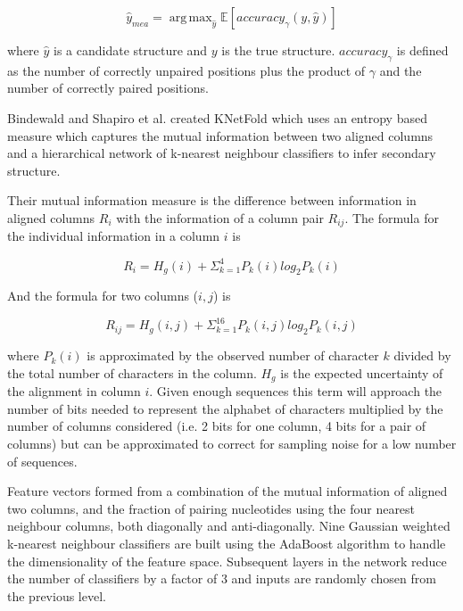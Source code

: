 \documentclass[journal]{IEEEtran}
\DeclareMathOperator*{\argmax}{arg\,max}
\begin{document}
\begin{equation}
	\hat{y}_{mea} = \argmax_{\hat{y}} \mathbb{E}[accuracy_{\gamma}(y, \hat{y})]
\end{equation}

where $\hat{y}$ is a candidate structure and $y$ is the true structure. $accuracy_{\gamma}$ is defined as the number of correctly unpaired positions plus the product of $\gamma$ and the number of correctly paired positions. 

Bindewald and Shapiro et al. \cite{bindewald2006rna} created KNetFold which uses an entropy based measure which captures the mutual information between two aligned columns and a hierarchical network of k-nearest neighbour classifiers to infer secondary structure. 

Their mutual information measure is the difference between information in aligned columns $R_i$ with the information of a column pair $R_{ij}$. The formula for the individual information in a column $i$ is 
	
\begin{equation}
	R_i = H_g(i) + \Sigma_{k=1}^4 P_k(i) log_2 P_k(i)
\end{equation}

And the formula for two columns ($i, j$) is

\begin{equation}
	R_{ij} = H_g(i, j) + \Sigma_{k=1}^{16} P_k(i, j) log_2 P_k(i, j)
\end{equation}

where $P_k(i)$ is approximated by the observed number of character $k$ divided by the total number of characters in the column. $H_g$ is the expected uncertainty of the alignment in column $i$. Given enough sequences this term will approach the number of bits needed to represent the alphabet of characters multiplied by the number of columns considered (i.e. 2 bits for one column, 4 bits for a pair of columns) but can be approximated to correct for sampling noise for a low number of sequences.

Feature vectors formed from a combination of the mutual information of aligned two columns, and the fraction of pairing nucleotides using the four nearest neighbour columns, both diagonally and anti-diagonally. Nine Gaussian weighted k-nearest neighbour classifiers are built using the AdaBoost algorithm to handle the dimensionality of the feature space. Subsequent layers in the network reduce the number of classifiers by a factor of 3 and inputs are randomly chosen from the previous level. 
\end{document}
